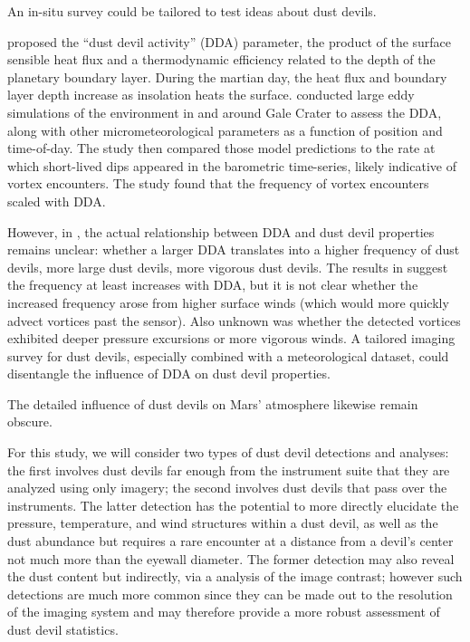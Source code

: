 \documentclass{aastex63}
\begin{document}
An in-situ survey could be tailored to test ideas about dust devils. 

\citet{1998JAtS...55.3244R} proposed the ``dust devil activity'' (DDA) parameter, the product of the surface sensible heat flux and a thermodynamic efficiency related to the depth of the planetary boundary layer. During the martian day, the heat flux and boundary layer depth increase as insolation heats the surface. \citet{2019JGRE..124.3442N} conducted large eddy simulations of the environment in and around Gale Crater to assess the DDA, along with other micrometeorological parameters as a function of position and time-of-day. The study then compared those model predictions to the rate at which short-lived dips appeared in the barometric time-series, likely indicative of vortex encounters. The study found that the frequency of vortex encounters scaled with DDA.

However, in \citet{1998JAtS...55.3244R}, the actual relationship between DDA and dust devil properties remains unclear: whether a larger DDA translates into a higher frequency of dust devils, more large dust devils, more vigorous dust devils. The results in \citet{2019JGRE..124.3442N} suggest the frequency at least increases with DDA, but it is not clear whether the increased frequency arose from higher surface winds (which would more quickly advect vortices past the sensor). Also unknown was whether the detected vortices exhibited deeper pressure excursions or more vigorous winds. A tailored imaging survey for dust devils, especially combined with a meteorological dataset, could disentangle the influence of DDA on dust devil properties. 

The detailed influence of dust devils on Mars' atmosphere likewise remain obscure. 

For this study, we will consider two types of dust devil detections and analyses: the first involves dust devils far enough from the instrument suite that they are analyzed using only imagery; the second involves dust devils that pass over the instruments. The latter detection has the potential to more directly elucidate the pressure, temperature, and wind structures within a dust devil, as well as the dust abundance but requires a rare encounter at a distance from a devil's center not much more than the eyewall diameter. The former detection may also reveal the dust content but indirectly, via a analysis of the image contrast; however such detections are much more common since they can be made out to the resolution of the imaging system and may therefore provide a more robust assessment of dust devil statistics. 
\end{document}
